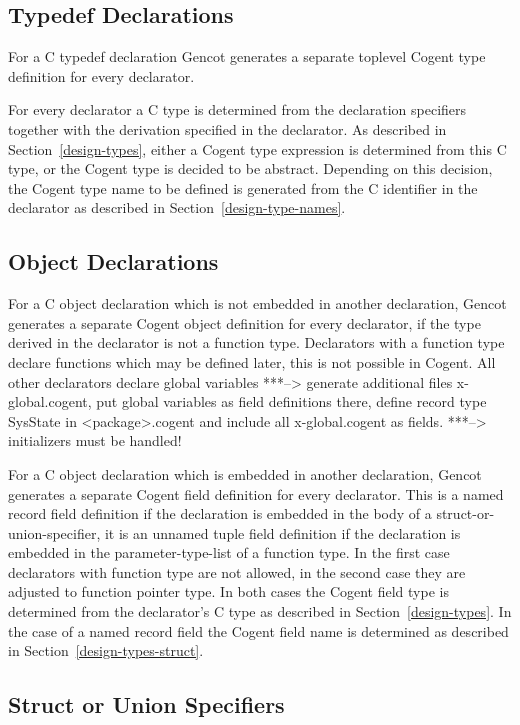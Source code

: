 \documentclass[a4paper]{report}
\begin{document}
\subsection{Typedef Declarations}

For a C typedef declaration Gencot generates a separate toplevel Cogent type definition for every declarator.

For every declarator a C type is determined from the declaration specifiers together with the derivation specified
in the declarator. As described in Section~\ref{design-types}, either a Cogent type expression is determined from this C type,
or the Cogent type is decided to be abstract. Depending on this decision, the Cogent type name to be defined  
is generated from the C identifier in the declarator as described in Section~\ref{design-type-names}.

\subsection{Object Declarations}

For a C object declaration which is not embedded in another declaration, Gencot generates a separate Cogent 
object definition for every declarator, if the type derived in the declarator is not a function type. Declarators
with a function type declare functions which may be defined later, this is not possible in Cogent. All other
declarators declare global variables 
***--> generate additional files x-global.cogent, put global variables as field definitions there, define record type
  SysState in <package>.cogent and include all x-global.cogent as fields.
***--> initializers must be handled!
  
For a C object declaration which is embedded in another declaration, Gencot generates a separate Cogent field 
definition for every declarator. This is a named record field definition if the declaration is embedded in the
body of a struct-or-union-specifier, it is an unnamed tuple field definition if the declaration is embedded in the
parameter-type-list of a function type. In the first case declarators with function type are not allowed, in the
second case they are adjusted to function pointer type. In both cases the Cogent field type is determined from the 
declarator's C type as described in Section~\ref{design-types}. In the case of a named record field the Cogent
field name is determined as described in Section~\ref{design-types-struct}.

\subsection{Struct or Union Specifiers}
\end{document}

